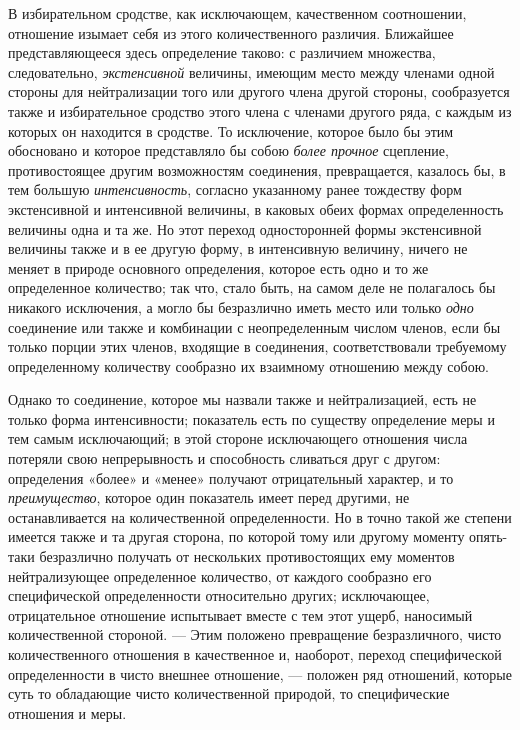 В избирательном сродстве, как исключающем, качественном соотношении,
отношение изымает себя из этого количественного различия. Ближайшее
представляющееся здесь определение таково: с различием множества,
следовательно, {\em экстенсивной} величины, имеющим
место между членами одной стороны для нейтрализации того или другого члена
другой стороны, сообразуется также и избирательное сродство этого члена с
членами другого ряда, с каждым из которых он находится в сродстве. То
исключение, которое было бы этим обосновано и которое представляло бы собою
{\em более прочное} сцепление, противостоящее другим
возможностям соединения, превращается, казалось бы, в тем большую
{\em интенсивность}, согласно указанному ранее
тождеству форм экстенсивной и интенсивной величины, в каковых обеих формах
определенность величины одна и та же. Но этот переход односторонней формы
экстенсивной величины также и в ее другую форму, в интенсивную величину,
ничего не меняет в природе основного определения, которое есть одно и то же
определенное количество; так что, стало быть, на самом деле не полагалось
бы никакого исключения, а могло бы безразлично иметь место или только
{\em одно} соединение или также и комбинации с
неопределенным числом членов, если бы только порции этих членов, входящие в
соединения, соответствовали требуемому определенному количеству сообразно
их взаимному отношению между собою.

Однако то соединение, которое мы назвали также и нейтрализацией, есть не
только форма интенсивности; показатель есть по существу определение меры и
тем самым исключающий; в этой стороне исключающего отношения числа потеряли
свою непрерывность и способность сливаться друг с другом: определения
«более» и «менее» получают отрицательный характер, и то
{\em преимущество}, которое один показатель имеет перед
другими, не останавливается на количественной определенности. Но в точно
такой же степени имеется также и та другая сторона, по которой тому или
другому моменту опять-таки безразлично получать от нескольких
противостоящих ему моментов нейтрализующее определенное количество, от
каждого сообразно его специфической определенности относительно других;
исключающее, отрицательное отношение испытывает вместе с тем этот ущерб,
наносимый количественной стороной. — Этим положено превращение
безразличного, чисто количественного отношения в качественное и, наоборот,
переход специфической определенности в чисто внешнее отношение, — положен
ряд отношений, которые суть то обладающие чисто количественной природой, то
специфические отношения и меры.


